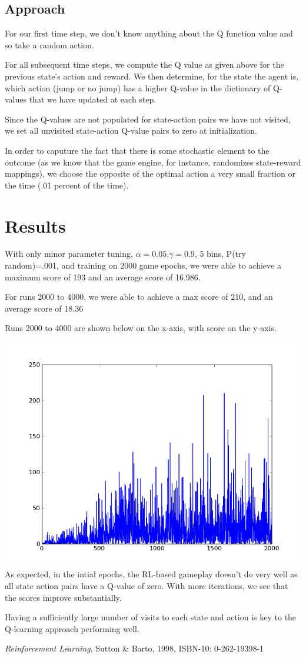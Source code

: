 \documentclass[11pt, oneside]{article}   	%
\begin{document}
\subsection*{Approach}

For our first time step, we don't know anything about the Q function value and so take a random action.

For all subsequent time steps, we compute the Q value as given above for the previous state's action and reward. We then determine, for the state the agent is, which action (jump or no jump) has a higher Q-value in the dictionary of Q-values that we have updated at each step.

Since the Q-values are not populated for state-action pairs we have not visited, we set all unvisited state-action Q-value pairs to zero at initialization.

In order to caputure the fact that there is some stochastic element to the outcome (as we know that the game engine, for instance, randomizes state-reward mappings), we choose the opposite of the optimal action a very small fraction or the time (.01 percent of the time).

\section*{Results}
With only minor parameter tuning, $\alpha = 0.05$,$\gamma = 0.9$, 5 bins, P(try random)=.001, and training on 2000 game epochs, we were able to achieve a maximum score of 193 and an average score of 16.986.

For runs 2000 to 4000, we were able to achieve a max score of 210, and an average score of 18.36

Runs 2000 to 4000 are shown below on the x-axis, with score on the y-axis.

\includegraphics[scale=.5]{graph2}
\newline
As expected, in the intial epochs, the RL-based gameplay doesn't do very well as all state action pairs have a Q-value of zero. With more iterations, we see that the scores improve substantially.

Having a sufficiently large number of visits to each state and action is key to the Q-learning approach performing well.

\begin{thebibliography}{1}

 \emph{Reinforcement Learning}, Sutton \& Barto, 1998, ISBN-10: 0-262-19398-1
 
  \end{thebibliography}
\end{document}
